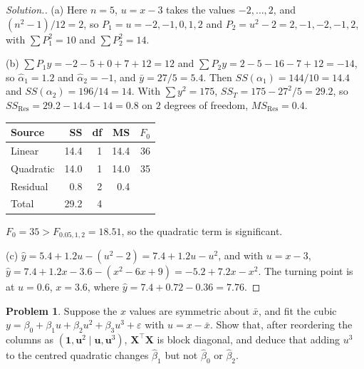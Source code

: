 \documentclass[11pt,a4paper]{article}
\numberwithin{equation}{section}
\theoremstyle{definition}
\newtheorem{problemx}{Problem}[subsection]
\newenvironment{problem}{\begin{problemx}}{\end{problemx}}
\newenvironment{solution}
  {\renewcommand{\qedsymbol}{}\begin{proof}[\textit{Solution}.]}
  {\end{proof}}
\begin{document}
\begin{solution}
(a) Here $n = 5$, $u = x - 3$ takes the values $-2, \dots, 2$, and $(n^2 - 1)/12 = 2$, so $P_1 = u = -2, -1, 0, 1, 2$ and
$P_2 = u^2 - 2 = 2, -1, -2, -1, 2$, with $\sum P_1^2 = 10$ and $\sum P_2^2 = 14$.

(b) $\sum P_1y = -2 - 5 + 0 + 7 + 12 = 12$ and $\sum P_2y = 2 - 5 - 16 - 7 + 12 = -14$, so $\hat\alpha_1 = 1.2$ and $\hat\alpha_2 = -1$, and
$\bar y = 27/5 = 5.4$. Then $SS(\alpha_1) = 144/10 = 14.4$ and $SS(\alpha_2) = 196/14 = 14$. With $\sum y^2 = 175$,
$SS_T = 175 - 27^2/5 = 29.2$, so $SS_{\mathrm{Res}} = 29.2 - 14.4 - 14 = 0.8$ on $2$ degrees of freedom, $MS_{\mathrm{Res}} = 0.4$.
\begin{center}
\begin{tabular}{lrrrr}
Source & SS & df & MS & $F_0$ \\
\hline
Linear & 14.4 & 1 & 14.4 & 36 \\
Quadratic & 14.0 & 1 & 14.0 & 35 \\
Residual & 0.8 & 2 & 0.4 & \\
\hline
Total & 29.2 & 4 & & \\
\end{tabular}
\end{center}
$F_0 = 35 > F_{0.05,1,2} = 18.51$, so the quadratic term is significant.

(c) $\hat y = 5.4 + 1.2u - (u^2 - 2) = 7.4 + 1.2u - u^2$, and with $u = x - 3$,
$\hat y = 7.4 + 1.2x - 3.6 - (x^2 - 6x + 9) = -5.2 + 7.2x - x^2$. The turning point is at $u = 0.6$, $x = 3.6$, where
$\hat y = 7.4 + 0.72 - 0.36 = 7.76$.
\end{solution}

\begin{problem}\label{prob:even-odd}
Suppose the $x$ values are symmetric about $\bar x$, and fit the cubic $y = \beta_0 + \beta_1u + \beta_2u^2 + \beta_3u^3 + \varepsilon$ with
$u = x - \bar x$. Show that, after reordering the columns as $(\mathbf{1}, \mathbf{u}^2 \mid \mathbf{u}, \mathbf{u}^3)$, $\mathbf{X}^\top\mathbf{X}$ is block diagonal, and
deduce that adding $u^3$ to the centred quadratic changes $\hat\beta_1$ but not $\hat\beta_0$ or $\hat\beta_2$.
\end{problem}
\end{document}
